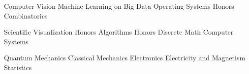 \documentclass[letterpaper,12pt]{article}
\newcommand{\delim}{\hspace{.1em}\textbullet\hspace{.25em}}
\newcommand{\resumeItem}[2]{
  \item\small{
    \textbf{#1}{: #2 \vspace{-2pt}}
  }
}
\newcommand{\resumeSubItem}[2]{\resumeItem{#1}{#2}\vspace{-4pt}}
\begin{document}
Computer Vision \delim{} Machine Learning on Big Data \delim{} Operating Systems
\delim{} Honors Combinatorics

Scientific Visualization \delim{} Honors Algorithms \delim{} Honors Discrete
Math \delim{} Computer Systems

Quantum Mechanics \delim{} Classical Mechanics \delim{} Electronics \delim Electricity and Magnetism \delim{} Statistics



  
\end{document}
